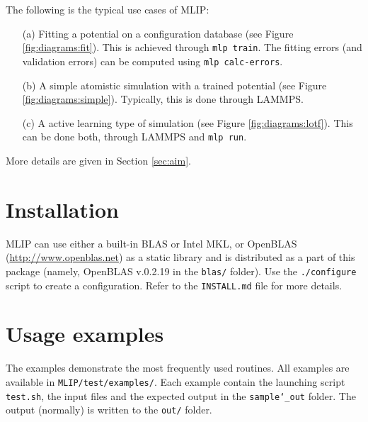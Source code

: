 \documentclass[12pt]{article}
\renewcommand{\_}{\char`_}
\begin{document}
The following is the typical use cases of MLIP:
\begin{itemize}
\item[(a)]
Fitting a potential on a configuration database (see Figure \ref{fig:diagrams:fit}).
This is achieved through \texttt{mlp train}.
The fitting errors (and validation errors) can be computed using \texttt{mlp calc-errors}.

\item[(b)]
A simple atomistic simulation with a trained potential (see Figure \ref{fig:diagrams:simple}).
Typically, this is done through LAMMPS.

\item[(c)]
A active learning type of simulation (see Figure \ref{fig:diagrams:lotf}).
This can be done both, through LAMMPS and \texttt{mlp run}.
\end{itemize}


More details are given in Section \ref{sec:aim}.

\section{Installation} \label{sec:install}

MLIP can use either a built-in BLAS or Intel MKL, or OpenBLAS (\url{http://www.openblas.net}) as a static library and is distributed as a part of this package (namely, OpenBLAS v.0.2.19 in the \texttt{blas/} folder). Use the \texttt{./configure} script to create a configuration.
Refer to the \texttt{INSTALL.md} file for more details.

\section{Usage examples} \label{Using}

The examples demonstrate the most frequently used routines.
All examples are available in \texttt{MLIP/test/examples/}.
Each example contain the launching script \texttt{test.sh}, the input files and the expected output in the \texttt{sample\_out} folder.
The output (normally) is written to the \texttt{out/} folder.
\end{document}
